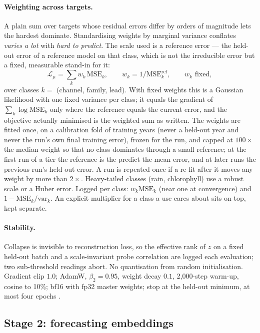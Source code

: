 \documentclass[10pt]{article}
\begin{document}
\paragraph{Weighting across targets.} A plain sum over targets whose residual
errors differ by orders of magnitude lets the hardest dominate.
Standardising weights by marginal variance conflates \emph{varies a lot}
with \emph{hard to predict}. The scale used is a reference error --- the
held-out error of a reference model on that class, which is not the
irreducible error but a fixed, measurable stand-in for it:
\begin{equation}
\mathcal{L}_\mu=\sum_k w_k\,\mathrm{MSE}_k,\qquad w_k=1/\mathrm{MSE}_k^{\text{ref}},
\qquad\text{$w_k$ fixed} ,
\end{equation}
over classes $k=$ (channel, family, lead). With fixed weights this is a
Gaussian likelihood with one fixed variance per class; it equals the
gradient of $\sum_k\log\mathrm{MSE}_k$ only where the reference equals the
current error, and the objective actually minimised is the weighted sum as
written. The weights are fitted once, on a calibration fold of training
years (never a held-out year and never the run's own final training error),
frozen for the run, and capped at $100\times$ the median weight so that no
class dominates through a small reference; at the first run of a tier the
reference is the predict-the-mean error, and at later runs the previous
run's held-out error. A run is repeated once if a re-fit after it moves any
weight by more than $2\times$. Heavy-tailed classes (rain, chlorophyll) use a
robust scale or a Huber error. Logged per class: $w_k\mathrm{MSE}_k$ (near
one at convergence) and $1-\mathrm{MSE}_k/\mathrm{var}_k$. An explicit
multiplier for a class a use cares about sits on top, kept separate.

\paragraph{Stability.} Collapse is invisible to reconstruction loss, so the
effective rank of $z$ on a fixed held-out batch and a scale-invariant probe
correlation are logged each evaluation; two sub-threshold readings abort. No
quantisation from random initialisation. Gradient clip $1.0$; AdamW,
$\beta_2=0.95$, weight decay $0.1$, 2{,}000-step warm-up, cosine to 10\%;
bf16 with fp32 master weights; stop at the held-out minimum, at most four
epochs \cite{datacon}.

\subsection{Stage 2: forecasting embeddings}\label{sec:stage2}
\end{document}
